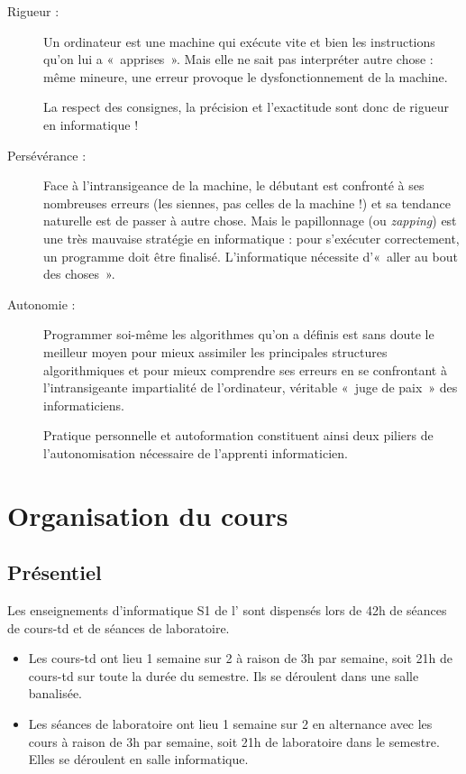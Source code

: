 \documentclass[11pt,a4paper,colorlinks,breaklinks]{article}
\begin{document}
\begin{description}
\item[Rigueur :] Un ordinateur est une machine qui exécute vite et bien les
	instructions qu'on lui a «~apprises~». Mais elle ne sait pas interpréter
	autre chose : même mineure, une erreur provoque le dysfonctionnement de la 
	machine.

	La respect des consignes, la précision et l'exactitude sont donc de 
	rigueur en informatique !
\item[Persévérance :] 
	Face à l'intransigeance de la machine, le débutant est confronté
	à ses nombreuses erreurs (les siennes, pas celles de la machine !) et sa tendance
	naturelle est de passer à autre chose. 
	Mais le papillonnage (ou {\em zapping})
	est une très mauvaise stratégie en informatique : pour s'exécuter correctement,
	un programme doit être finalisé. L'informatique nécessite d'«~aller au bout des
	choses~».
\item[Autonomie :] Programmer soi-même les algorithmes
	qu'on a définis est sans doute le meilleur moyen pour mieux assimiler
	les principales structures algorithmiques et pour mieux comprendre ses
	erreurs en se confrontant à l'intransigeante impartialité de l'ordinateur,
	vérita\-ble «~juge de paix~» des informaticiens.
	
	Pratique personnelle et autoformation constituent ainsi deux piliers de
	l'autonomisation nécessaire de l'apprenti informaticien.
\end{description}


\section{Organisation du cours}

\subsection{Présentiel}
Les enseignements d'informatique S1 de l'\enib{} sont dispensés lors de 42h
de séances de cours-td et de séances de laboratoire.
\begin{itemize}
\item Les cours-td ont lieu 1 semaine sur 2 à raison de 3h par semaine, soit
21h de cours-td sur toute la durée du semestre. Ils se déroulent dans une salle
banalisée.
\item Les séances de laboratoire ont lieu 1 semaine sur 2 en alternance avec les 
cours à raison de 3h par semaine, soit 21h de laboratoire dans le semestre. Elles
se déroulent en salle informatique.
\end{itemize}
\end{document}
